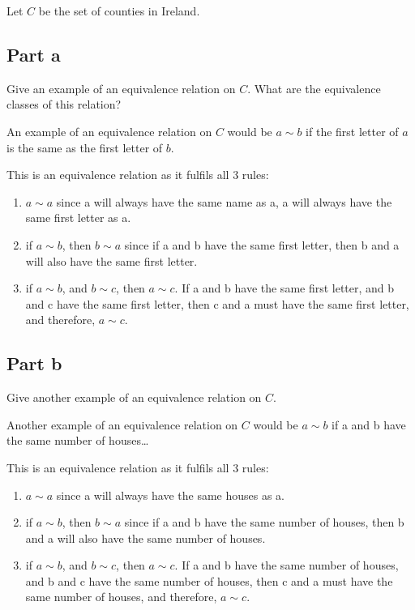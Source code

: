 \documentclass[12pt]{article} %
\begin{document}
\pagebreak

\begin{homeworkProblem}
    Let $C$ be the set of counties in Ireland.

    \subsection*{Part a}

    \begin{grayBoxed}
        Give an example of an equivalence relation on $C$. What are the equivalence classes of this relation?
    \end{grayBoxed}

    An example of an equivalence relation on $C$ would be $a \sim b$ if the first letter of $a$ is the same as the first letter of $b$.

    This is an equivalence relation as it fulfils all 3 rules:
    \begin{enumerate}
        \item $a \sim a$ since a will always have the same name as a, a will always have the same first letter as a.
        \item if $a \sim b$, then $b \sim a$ since if a and b have the same first letter, then b and a will also have the same  first letter.
        \item if $a \sim b$, and $b \sim c$, then $a \sim c$. If a and b have the same first letter, and b and c have the same first letter, then c and a must have the same first letter, and therefore, $a \sim c$.
    \end{enumerate}


    \subsection*{Part b}

    \begin{grayBoxed}
        Give another example of an equivalence relation on $C$.
    \end{grayBoxed}

    Another example of an equivalence relation on $C$ would be $a \sim b$ if a and b have the same number of houses\dots

    This is an equivalence relation as it fulfils all 3 rules:
    \begin{enumerate}
        \item $a \sim a$ since a will always have the same houses as a.
        \item if $a \sim b$, then $b \sim a$ since if a and b have the same number of houses, then b and a will also have the same number of houses.
        \item if $a \sim b$, and $b \sim c$, then $a \sim c$. If a and b have the same number of houses, and b and c have the same number of houses, then c and a must have the same number of houses, and therefore, $a \sim c$.
    \end{enumerate}


\end{homeworkProblem}
\end{document}
